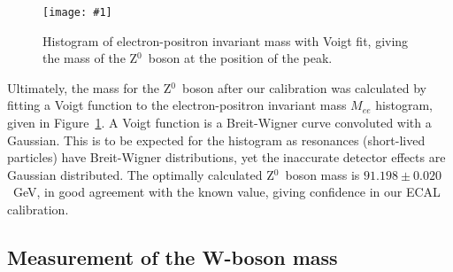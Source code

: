 \documentclass[twocolumn]{article}
\newcommand{\insertFigure}[1]{%
   \texttt{[image: \#1]}%
}
\begin{document}
\begin{figure} [!h]
	\centering
	\insertFigure{Images/FinalIterationLabeled.png}
	\caption{Histogram of electron-positron invariant mass with Voigt fit, giving the mass of the Z$^0$~boson at the position of the peak.}
	\label{fig:final_iteration}
\end{figure}
\par Ultimately, the mass for the Z$^0$~boson after our calibration was calculated by fitting a Voigt function to the electron-positron invariant mass $M_{ee}$ histogram, given in Figure~\ref{fig:final_iteration}. A Voigt function is a Breit-Wigner curve convoluted with a Gaussian. This is to be expected for the histogram as resonances (short-lived particles) have Breit-Wigner distributions, yet the inaccurate detector effects are Gaussian distributed. The optimally calculated Z$^0$~boson mass is $91.198 \pm 0.020$~GeV, in good agreement with the known value, giving confidence in our ECAL calibration.







\subsection{Measurement of the W-boson mass} 
\end{document}
